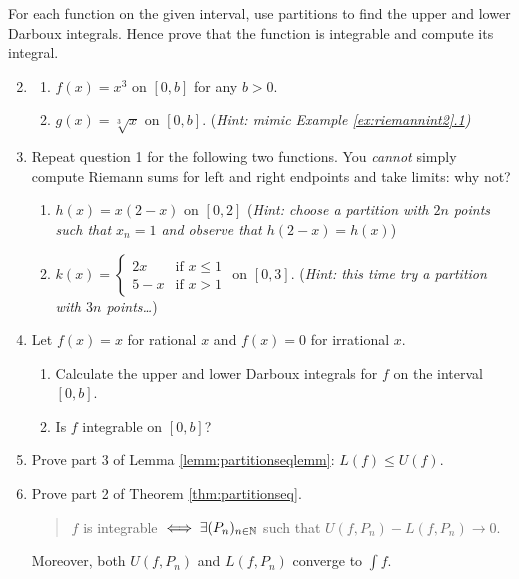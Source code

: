 \begin{exercises}
\exstart For each function on the given interval, use partitions to find the upper and lower Darboux integrals. Hence prove that the function is integrable and compute its integral.
\begin{enumerate}\setcounter{enumi}{1}
	\item[]\begin{enumerate}
	  \item $f(x)=x^3$ on $[0,b]$ for any $b>0$.
	  
	  \item $g(x)=\sqrt[3]{x}$ on $[0,b]$.\smallbreak
	  (\emph{Hint: mimic Example \hyperref[ex:riemannint2]{\ref*{ex:riemannint2}.1})}
	\end{enumerate}
	
	\item Repeat question 1 for the following two functions. You \emph{cannot} simply compute Riemann sums for left and right endpoints and take limits: why not?
	\begin{enumerate}  
	  \item $h(x)=x(2-x)$ on $[0,2]$\smallbreak
	  (\emph{Hint: choose a partition with $2n$ points such that $x_n=1$ and observe that $h(2-x)=h(x)$})
	  
	  \item $k(x)=\begin{cases}
	  2x&\text{if }x\le 1\\
	 	5-x&\text{if }x>1
	  \end{cases}$ on $[0,3]$.\smallbreak
	  (\emph{Hint: this time try a partition with $3n$ points\ldots})
	\end{enumerate}

  \item Let $f(x)=x$ for rational $x$ and $f(x)=0$ for irrational $x$.
    \begin{enumerate}
    \item Calculate the upper and lower Darboux integrals for $f$ on the interval $[0,b]$.
    \item Is $f$ integrable on $[0,b]$?
    \end{enumerate}
    
	\item Prove part 3 of Lemma \ref{lemm:partitionseqlemm}: $L(f)\le U(f)$.

	\item Prove part 2 of Theorem \ref{thm:partitionseq}.
 	\begin{quote}
 	$f$ is integrable $\iff\exists (P_n)_{n\in\mathbb{N}}$ such that $U(f,P_n)-L(f,P_n)\to 0$.
 	\end{quote}
 	Moreover, both $U(f,P_n)$ and $L(f,P_n)$ converge to $\int f$.
	

\end{enumerate}
\end{exercises}
